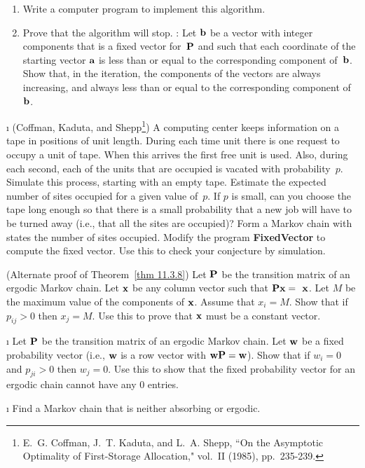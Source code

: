 \begin{LJSItem}
\begin{enumerate}
\item Write a computer program to implement this algorithm.

\item Prove that the algorithm will stop.  : Let ${\mbox{\bf b}\/}$ be a
vector with integer components that is a fixed vector for~${\mbox{\bf P}\/}$ and such
that
each coordinate of the starting vector ${\mbox{\bf a}\/}$ is less than or equal to the
corresponding component of~${\mbox{\bf b}\/}$.  Show that, in the iteration, the
components
of the vectors are always increasing, and always less than or equal to the
corresponding component of~${\mbox{\bf b}\/}$.
\end{enumerate}

\i\label{exer 11.3.29} (Coffman, Kaduta, and Shepp\footnote{E.~G. Coffman, 
J.~T. Kaduta, and L.~A.  Shepp,  ``On the Asymptotic Optimality of
First-Storage
Allocation,"  vol.~II (1985),
pp.~235-239.}) A
computing center  keeps information on a tape in positions of unit length. 
During each
time unit  there is one request to occupy a unit of tape.  When this arrives
the first 
free unit is used.  Also, during each second, each of the units that are
occupied is
vacated with probability~$p$.  Simulate this process, starting with an empty
tape.  Estimate the expected number of sites occupied for a given value
of~$p$.  If $p$ is small, can you choose the tape long enough so that there is
a small probability that a new job will have to be turned away (i.e., that all
the sites are occupied)?  Form a Markov chain with states the number of sites
occupied.  Modify the program {\bf  FixedVector} to compute the fixed
vector.  Use this to check your conjecture by simulation.

\istar\label{exer 11.3.30} (Alternate proof of Theorem~\ref{thm 11.3.8})  Let
${\mbox{\bf P}\/}$ be the
transition matrix of an ergodic  Markov chain.  Let ${\mbox{\bf x}\/}$ be any column
vector such that
$\mat{P}
\mat{x} =
\mat{ x}$.  Let $M$ be the  maximum value of the components of ${\mbox{\bf x}\/}$. 
Assume that $x_i
= M$.  Show that if $p_{ij} > 0$ then $x_j = M$.  Use this to prove that
${\mbox{\bf x}\/}$
must be a constant vector.

\i\label{exer 11.3.31} Let ${\mbox{\bf P}\/}$ be the transition matrix of an ergodic
Markov 
chain.  Let ${\mbox{\bf w}\/}$ be a fixed probability vector (i.e., ${\mbox{\bf w}\/}$ is a row
vector 
with ${\mbox{\bf w}\/}{\mbox{\bf P}\/} = {\mbox{\bf w}\/}$).  Show that if $w_i = 0$ and $p_{ji} > 0$
then 
$w_j = 0$.  Use this to show that the fixed probability vector for an ergodic
chain
cannot have any 0 entries.

\i\label{exer 11.3.32} Find a Markov chain that is neither absorbing or
ergodic.

\end{LJSItem}

